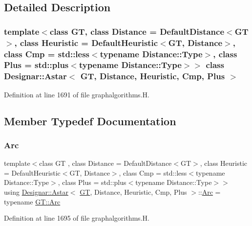 \subsection{Detailed Description}
\subsubsection*{template$<$class GT, class Distance = Default\+Distance$<$\+G\+T$>$, class Heuristic = Default\+Heuristic$<$\+G\+T, Distance$>$, class Cmp = std\+::less$<$typename Distance\+::\+Type$>$, class Plus = std\+::plus$<$typename Distance\+::\+Type$>$$>$\newline
class Designar\+::\+Astar$<$ G\+T, Distance, Heuristic, Cmp, Plus $>$}



Definition at line 1691 of file graphalgorithms.\+H.



\subsection{Member Typedef Documentation}
\mbox{\label{class_designar_1_1_astar_a4d0b1c7cb0a71b5cfe3d21ea37c12108}} 
\subsubsection{\texorpdfstring{Arc}{Arc}}
{\footnotesize\ttfamily template$<$class GT , class Distance  = Default\+Distance$<$\+G\+T$>$, class Heuristic  = Default\+Heuristic$<$\+G\+T, Distance$>$, class Cmp  = std\+::less$<$typename Distance\+::\+Type$>$, class Plus  = std\+::plus$<$typename Distance\+::\+Type$>$$>$ \\
using \hyperlink{class_designar_1_1_astar}{Designar\+::\+Astar}$<$ \hyperlink{demo-buildgraph_8_c_a3001c40d2c31ca87ed96cd7d1334a55e}{GT}, Distance, Heuristic, Cmp, Plus $>$\+::\hyperlink{class_designar_1_1_astar_a4d0b1c7cb0a71b5cfe3d21ea37c12108}{Arc} =  typename \hyperlink{class_designar_1_1_graph_a74c730ef4ce2d20f998d72bd25c2b5bf}{G\+T\+::\+Arc}}



Definition at line 1695 of file graphalgorithms.\+H.

\mbox{\label{class_designar_1_1_astar_a0d4cdf6b94255824c6c93e5ae18e9eb7}} 
